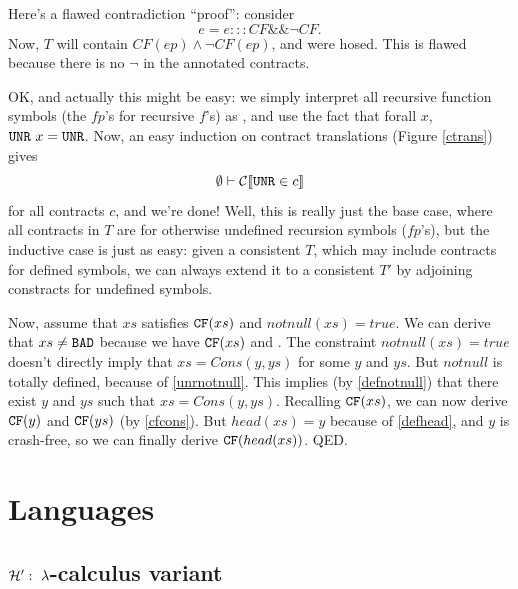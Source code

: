 \documentclass[preprint]{sigplanconf}
\begin{document}
{  Here's a flawed contradiction ``proof'': consider
  \[
  e = e ::: CF \&\& \neg CF.
  \]
  Now, $T$ will contain $CF(ep) \land \neg CF(ep)$, and were hosed.
  This is flawed because there is no $\neg$ in the annotated
  contracts.

  OK, and actually this might be easy: we simply interpret all
  recursive function symbols (the $fp$'s for recursive $f$'s) as
  \unr{}, and use the fact that forall $x$, $\texttt{UNR}{}~x = \texttt{UNR}$.  Now,
  an easy induction on contract translations (Figure \ref{ctrans})
  gives \[ \emptyset \vdash \mathcal{C} \llbracket \texttt{UNR} \in c \rrbracket \] for all contracts $c$, and we're done!  Well, this is really just
  the base case, where all contracts in $T$ are for otherwise
  undefined recursion symbols ($fp$'s), but the inductive case is just
  as easy: given a consistent $T$, which may include contracts for
  defined symbols, we can always extend it to a consistent $T'$ by
  adjoining constracts for undefined symbols.

}

Now, assume that $xs$ satisfies
$\texttt{CF}(xs)$ and $notnull(xs) = true$.  We can derive that $xs \neq \texttt{BAD}$
because we have $\texttt{CF}(xs)$ and . The constraint
$notnull(xs) = true$ doesn't directly imply that $xs = Cons(y,ys)$ for
some $y$ and $ys$. But $notnull$ is totally defined, because of
\eqref{unrnotnull}. This implies (by \eqref{defnotnull}) that there exist
$y$ and $ys$ such that $xs = Cons(y,ys)$. Recalling $\texttt{CF}(xs)$, we can
now derive $\texttt{CF}(y)$ and $\texttt{CF}(ys)$ (by \eqref{cfcons}). But $head(xs) =
y$ because of \eqref{defhead}, and $y$ is crash-free, so we can finally
derive $\texttt{CF}(head(xs))$. QED.


\section{Languages}
\subsection{$\mathcal{H}':~\lambda$-calculus variant}
\end{document}
